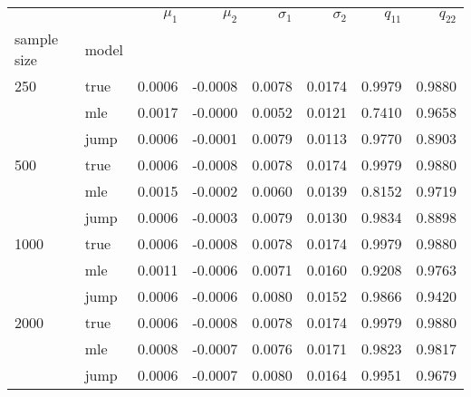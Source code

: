 \begin{tabular}{llrrrrrr}
\toprule
     &      &  $\mu_1$ &  $\mu_2$ &  $\sigma_1$ &  $\sigma_2$ &  $q_{11}$ &  $q_{22}$ \\
sample size & model &          &          &             &             &           &           \\
\midrule
250  & true &   0.0006 &  -0.0008 &      0.0078 &      0.0174 &    0.9979 &    0.9880 \\
     & mle &   0.0017 &  -0.0000 &      0.0052 &      0.0121 &    0.7410 &    0.9658 \\
     & jump &   0.0006 &  -0.0001 &      0.0079 &      0.0113 &    0.9770 &    0.8903 \\
500  & true &   0.0006 &  -0.0008 &      0.0078 &      0.0174 &    0.9979 &    0.9880 \\
     & mle &   0.0015 &  -0.0002 &      0.0060 &      0.0139 &    0.8152 &    0.9719 \\
     & jump &   0.0006 &  -0.0003 &      0.0079 &      0.0130 &    0.9834 &    0.8898 \\
1000 & true &   0.0006 &  -0.0008 &      0.0078 &      0.0174 &    0.9979 &    0.9880 \\
     & mle &   0.0011 &  -0.0006 &      0.0071 &      0.0160 &    0.9208 &    0.9763 \\
     & jump &   0.0006 &  -0.0006 &      0.0080 &      0.0152 &    0.9866 &    0.9420 \\
2000 & true &   0.0006 &  -0.0008 &      0.0078 &      0.0174 &    0.9979 &    0.9880 \\
     & mle &   0.0008 &  -0.0007 &      0.0076 &      0.0171 &    0.9823 &    0.9817 \\
     & jump &   0.0006 &  -0.0007 &      0.0080 &      0.0164 &    0.9951 &    0.9679 \\
\bottomrule
\end{tabular}
